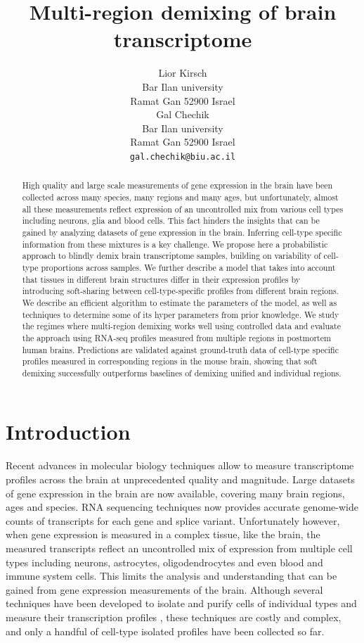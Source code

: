 \documentclass{article} %
\title{Multi-region demixing of brain transcriptome}
\author{
Lior Kirsch \\ Bar Ilan university \\ Ramat Gan 52900 Israel \\ 
\And
Gal Chechik \\ Bar Ilan university \\ Ramat Gan 52900 Israel \\
\texttt{gal.chechik@biu.ac.il} \\
}
\begin{document}
\maketitle
\begin{abstract}
    High quality and large scale measurements of gene expression in the brain have been collected across many species, many regions and many ages, but unfortunately, almost all these measurements reflect  expression of an uncontrolled mix from various cell types including neurons, glia and blood cells. This fact hinders the insights that can be gained by analyzing datasets of gene expression in the brain. Inferring cell-type specific information from these mixtures is a key challenge. We propose here a probabilistic approach to blindly demix brain transcriptome samples, building on variability of cell-type proportions across samples. We further describe a model that takes into account that tissues in different brain structures differ in their expression profiles by introducing soft-sharing between cell-type-specific profiles from different brain regions. We describe an efficient algorithm to estimate the parameters of the model, as well as techniques to determine some of its hyper parameters from prior knowledge. We study the regimes where multi-region demixing works well using controlled data and evaluate the approach using RNA-seq profiles measured from multiple regions in postmortem human brains. Predictions are validated against ground-truth data of cell-type specific profiles measured in corresponding regions in the mouse brain, showing that soft demixing successfully outperforms baselines of demixing unified and individual regions. 
\end{abstract}

\section{Introduction}
\label{introduction}
Recent advances in molecular biology techniques allow to measure transcriptome profiles across the brain at unprecedented quality and magnitude. Large datasets of gene expression in the brain are now available, covering  many brain regions, ages and species. RNA sequencing techniques now provides accurate genome-wide counts of transcripts for each gene and splice variant. Unfortunately however, when gene expression is measured in a complex tissue, like the brain, the measured transcripts reflect an uncontrolled mix of expression from multiple cell types including neurons, astrocytes, oligodendrocytes and even blood and immune system cells. This limits the analysis and understanding that can be gained from gene expression measurements of the brain. Although several techniques have been developed to isolate and purify cells of individual types and measure their transcription profiles \cite{okaty2011cell,barres2014,darmanis2015survey}, these techniques are costly and complex, and only a handful of cell-type isolated profiles have been collected so far. 
\end{document}
